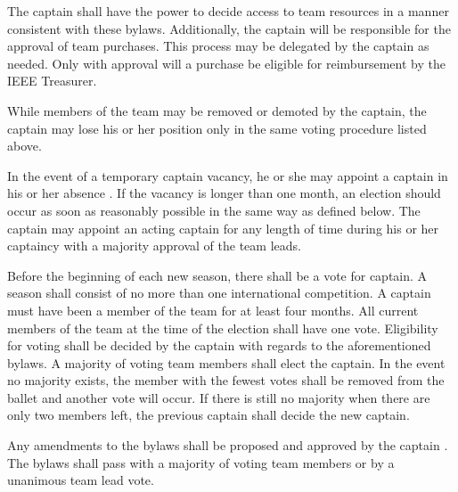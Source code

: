 \documentclass[12pt]{constitution}
\begin{document}
The captain shall have the power to decide access to team resources in a manner consistent with these bylaws. Additionally, the captain will be responsible for the approval of team purchases. This process may be delegated by the captain as needed. Only with approval will a purchase be eligible for reimbursement by the IEEE Treasurer.

While members of the team may be removed or demoted by the captain, the captain may lose his or her position only in the same voting procedure listed above.

In the event of a temporary captain vacancy, he or she may appoint a captain in his or her absence . If the vacancy is longer than one month, an election should occur as soon as reasonably possible in the same way as defined below. The captain may appoint an acting captain for any length of time during his or her captaincy with a majority approval of the team leads.


\label{art:elect}

Before the beginning of each new season, there shall be a vote for captain. A season shall consist of no more than one international competition. A captain must have been a member of the team for at least four months. All current members of the team at the time of the election shall have one vote. Eligibility for voting shall be decided by the captain with regards to the aforementioned bylaws. A majority of voting team members shall elect the captain. In the event no majority exists, the member with the fewest votes shall be removed from the ballet and another vote will occur. If there is still no majority when there are only two members left, the previous captain shall decide the new captain.


\label{art:bylaw}

Any amendments to the bylaws shall be proposed and approved by the captain . The bylaws shall pass with a majority of voting team members or by a unanimous team lead vote.
\end{document}
